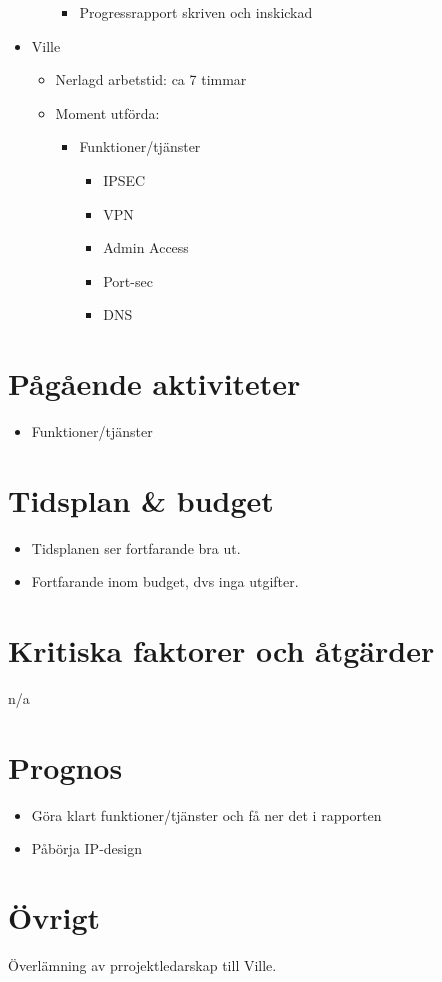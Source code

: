 \begin{itemize}[noitemsep]
\begin{itemize}[noitemsep]
\begin{itemize}[noitemsep]
\begin{itemize}
        	\end{itemize}
        	\item Progressrapport skriven och inskickad
        \end{itemize}
    \end{itemize}
    \item Ville
    \begin{itemize}[noitemsep]
        \item Nerlagd arbetstid: ca 7 timmar
        \item Moment utförda:
        \begin{itemize}[noitemsep]
            \item Funktioner/tjänster
            \begin{itemize}
            	\item IPSEC
            	\item VPN
            	\item Admin Access
            	\item Port-sec
            	\item DNS
            \end{itemize}
        \end{itemize}
    \end{itemize}
\end{itemize}

\section{Pågående aktiviteter}
\begin{itemize}[noitemsep]
    \item Funktioner/tjänster
\end{itemize}

\section{Tidsplan \& budget}
\begin{itemize}[noitemsep]
    \item Tidsplanen ser fortfarande bra ut.
    \item Fortfarande inom budget, dvs inga utgifter.
\end{itemize}

\section{Kritiska faktorer och åtgärder}
n/a

\section{Prognos}	
\begin{itemize}[noitemsep]
    \item Göra klart funktioner/tjänster och få ner det i rapporten
    \item Påbörja IP-design
\end{itemize}

\section{Övrigt}
Överlämning av prrojektledarskap till Ville.
